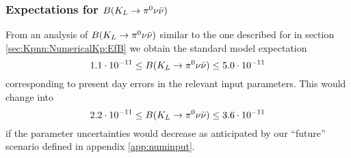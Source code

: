 \subsubsection{Expectations for $B(K_L \to \pi^0\nu\bar\nu)$}
\label{sec:Kpnn:NumericalKL:EfB}
From an analysis of $B(K_L \to \pi^0\nu\bar\nu)$ similar to the one described for
\kpnn in section \ref{sec:Kpnn:NumericalKp:EfB} we obtain the
standard model expectation
\begin{equation}\label{klpn1}
1.1\cdot 10^{-11}\leq B(K_L \to \pi^0\nu\bar\nu)\leq 5.0\cdot 10^{-11}
\end{equation}
corresponding to present day errors in the relevant input
parameters. This would change into
\begin{equation}\label{klpn2}
2.2\cdot 10^{-11}\leq B(K_L \to \pi^0\nu\bar\nu)\leq 3.6\cdot 10^{-11}
\end{equation}
if the parameter uncertainties would decrease as anticipated by our 
``future'' scenario defined in appendix \ref{app:numinput}.

